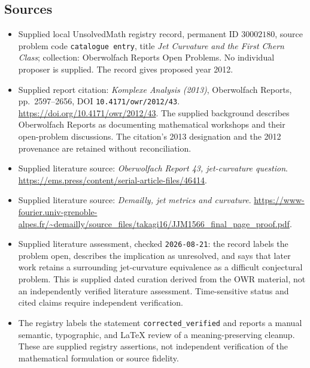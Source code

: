 \documentclass[11pt]{article}
\begin{document}
\subsection{Sources}
\begin{itemize}
\item Supplied local UnsolvedMath registry record, permanent ID \(30002180\), source problem code \texttt{catalogue entry}, title \emph{Jet Curvature and the First Chern Class}; collection: Oberwolfach Reports Open Problems. No individual proposer is supplied. The record gives proposed year 2012.
\item Supplied report citation: \emph{Komplexe Analysis (2013)}, Oberwolfach Reports, pp.\ 2597--2656, DOI \texttt{10.4171/owr/2012/43}. \url{https://doi.org/10.4171/owr/2012/43}. The supplied background describes Oberwolfach Reports as documenting mathematical workshops and their open-problem discussions. The citation's 2013 designation and the 2012 provenance are retained without reconciliation.
\item Supplied literature source: \emph{Oberwolfach Report 43, jet-curvature question}. \url{https://ems.press/content/serial-article-files/46414}.
\item Supplied literature source: \emph{Demailly, jet metrics and curvature}. \url{https://www-fourier.univ-grenoble-alpes.fr/~demailly/source_files/takagi16/JJM1566_final_page_proof.pdf}.
\item Supplied literature assessment, checked \texttt{2026-08-21}: the record labels the problem open, describes the implication as unresolved, and says that later work retains a surrounding jet-curvature equivalence as a difficult conjectural problem. This is supplied dated curation derived from the OWR material, not an independently verified literature assessment. Time-sensitive status and cited claims require independent verification.
\item The registry labels the statement \texttt{corrected\_verified} and reports a manual semantic, typographic, and LaTeX review of a meaning-preserving cleanup. These are supplied registry assertions, not independent verification of the mathematical formulation or source fidelity.
\end{itemize}
\end{document}
